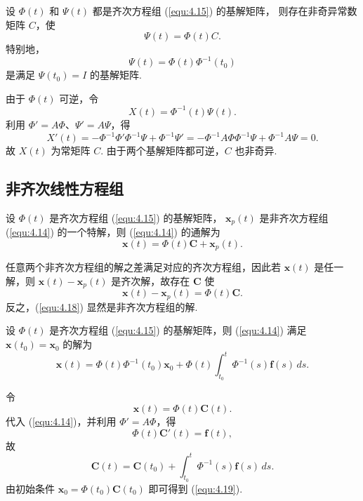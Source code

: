 \begin{thm}\label{thm:4.3.6}
设 $\Phi(t)$ 和 $\Psi(t)$ 都是齐次方程组 (\ref{equ:4.15}) 的基解矩阵，
则存在非奇异常数矩阵 $C$，使
\[
\Psi(t)=\Phi(t)C.
\]
特别地，
\[
\Psi(t)=\Phi(t)\Phi^{-1}(t_0)
\]
是满足 $\Psi(t_0)=I$ 的基解矩阵.
\end{thm}

\begin{pf1}
由于 $\Phi(t)$ 可逆，令
\[
X(t)=\Phi^{-1}(t)\Psi(t).
\]
利用 $\Phi'=A\Phi$、$\Psi'=A\Psi$，得
\[
X'(t)
=-\Phi^{-1}\Phi'\Phi^{-1}\Psi+\Phi^{-1}\Psi'
=-\Phi^{-1}A\Phi\Phi^{-1}\Psi
+\Phi^{-1}A\Psi=0.
\]
故 $X(t)$ 为常矩阵 $C$. 由于两个基解矩阵都可逆，$C$ 也非奇异.
\end{pf1}

\subsection{非齐次线性方程组}

\begin{thm}\label{thm:4.3.7}
设 $\Phi(t)$ 是齐次方程组 (\ref{equ:4.15}) 的基解矩阵，
$\bm{x}_p(t)$ 是非齐次方程组 (\ref{equ:4.14}) 的一个特解，则
(\ref{equ:4.14}) 的通解为
\begin{equation}\label{equ:4.18}
\bm{x}(t)=\Phi(t)\bm{C}+\bm{x}_p(t).
\end{equation}
\end{thm}

\begin{pf1}
任意两个非齐次方程组的解之差满足对应的齐次方程组，因此若
$\bm{x}(t)$ 是任一解，则
$\bm{x}(t)-\bm{x}_p(t)$ 是齐次解，故存在 $\bm{C}$ 使
\[
\bm{x}(t)-\bm{x}_p(t)=\Phi(t)\bm{C}.
\]
反之，(\ref{equ:4.18}) 显然是非齐次方程组的解.
\end{pf1}

\begin{thm}[(常数变易公式)]\label{thm:4.3.8}
设 $\Phi(t)$ 是齐次方程组 (\ref{equ:4.15}) 的基解矩阵，则
(\ref{equ:4.14}) 满足 $\bm{x}(t_0)=\bm{x}_0$ 的解为
\begin{equation}\label{equ:4.19}
\bm{x}(t)
=\Phi(t)\Phi^{-1}(t_0)\bm{x}_0
+\Phi(t)\int_{t_0}^{t}\Phi^{-1}(s)\bm{f}(s)\,ds.
\end{equation}
\end{thm}

\begin{pf1}
令
\[
\bm{x}(t)=\Phi(t)\bm{C}(t).
\]
代入 (\ref{equ:4.14})，并利用 $\Phi'=A\Phi$，得
\[
\Phi(t)\bm{C}'(t)=\bm{f}(t),
\]
故
\[
\bm{C}(t)=\bm{C}(t_0)+\int_{t_0}^{t}\Phi^{-1}(s)\bm{f}(s)\,ds.
\]
由初始条件 $\bm{x}_0=\Phi(t_0)\bm{C}(t_0)$ 即可得到 (\ref{equ:4.19}).
\end{pf1}

